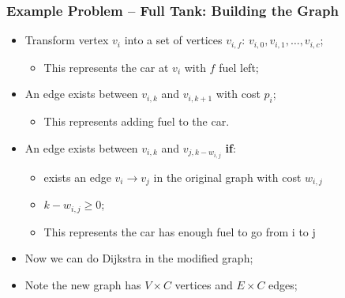 \begin{frame}
  \frametitle{Example Problem -- Full Tank: Building the Graph}

    \begin{center}
    \end{center}

    \begin{itemize}
      \item Transform vertex $v_i$ into a set of vertices $v_{i,f}$: $v_{i,0}, v_{i,1}, \ldots, v_{i,c}$;
      \begin{itemize}
        \item This represents the car at $v_i$ with $f$ fuel left;
      \end{itemize}
      \item An edge exists between $v_{i,k}$ and $v_{i,k+1}$ with cost $p_i$;
      \begin{itemize}
        \item This represents adding fuel to the car.
      \end{itemize}
      \item An edge exists between $v_{i,k}$ and $v_{j,k-w_{i,j}}$ {\bf if}:
      \begin{itemize}
        \item exists an edge $v_i \to v_j$ in the original graph with cost $w_{i,j}$
        \item $k-w_{i,j} \geq 0$;
        \item This represents the car has enough fuel to go from i to j
      \end{itemize}
      \item Now we can do Dijkstra in the modified graph;
      \item Note the new graph has $V\times C$ vertices and $E\times C$ edges;
    \end{itemize}
\end{frame}

